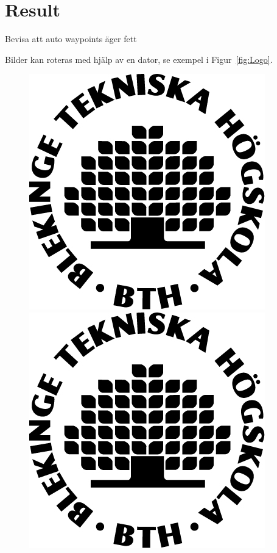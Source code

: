 \documentclass[a4paper]{article}
\begin{document}
\section{Result}
Bevisa att auto waypoints äger fett

Bilder kan roteras med hjälp av en dator, se exempel i Figur~\ref{fig:Logo}.

\begin{figure}[h]
\centering
\includegraphics[scale=0.9, angle=20]{bth_logo.jpg}
\includegraphics[scale=0.8, angle=40]{bth_logo.jpg}

\end{figure}
\end{document}

